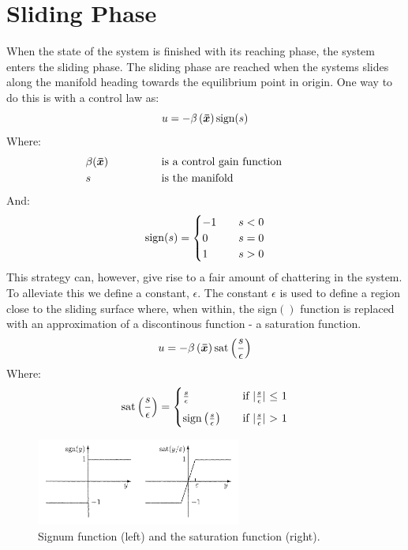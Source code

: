 \chapter{Sliding Phase}
When the state of the system is finished with its reaching phase, the system enters the sliding phase. The sliding phase
are reached when the systems slides along the manifold heading towards the equilibrium point in origin. One way to do
this is with a control law as:
\begin{equation}
  u = -\beta \left( \bm{\bar{x}} \right)\mathrm{sign}(s)
\end{equation}
Where:
\begin{alignat}{5}
       & \beta (\bm{\bar{x}}) & \hspace{1cm} & \quad\text{is a control gain function} \hspace{1cm} &  & \nonumber \\ 
       & s                & \hspace{1cm} & \quad\text{is the manifold} \hspace{1cm}            &  & \nonumber \\ 
\end{alignat}
And:
\begin{equation}
  \mathrm{sign}(s) =
  \begin{cases}
    -1 & \quad s < 0 \\
     0 & \quad s = 0 \\
     1 & \quad s > 0
  \end{cases}
\nonumber
\end{equation}
This strategy can, however, give rise to a fair amount of chattering in the system. To alleviate this we define a
constant, $\epsilon$. The constant $\epsilon$ is used to define a region close to the sliding surface where, when
within, the sign$()$ function is replaced with an approximation of a discontinous function - a saturation function.
\begin{equation}
  u = -\beta\left( \bm{\bar{x}} \right) \mathrm{sat}\left( \frac{s}{\epsilon} \right)
\end{equation}
Where:
\begin{equation}
  \mathrm{sat}\left( \frac{s}{\epsilon} \right) =
  \begin{cases}
    \frac{s}{\epsilon} &\quad \text{if $\vert\frac{s}{\epsilon}\vert$ $\leq$ 1} \\[2mm]
    \mathrm{sign}\left( \frac{s}{\epsilon} \right) &\quad \text{if $\vert \frac{s}{\epsilon}\vert$ $>$ 1}
  \end{cases}
\end{equation}

\begin{figure}[H]
  \centering
  \includegraphics[width=0.6\textwidth]{saturation}
  \caption{Signum function (left) and the saturation function (right).}
  \label{fig:sign_sat}
\end{figure}


